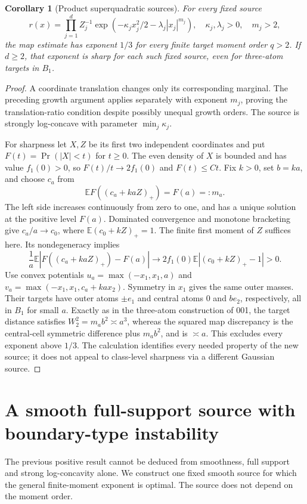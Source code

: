 \documentclass[11pt]{article}
\newtheorem{corollary}[theorem]{Corollary}
\theoremstyle{remark}\newtheorem{remark}[theorem]{Remark}
\newcommand{\E}{\mathbb E}
\begin{document}
\begin{corollary}[Product superquadratic sources]\label{cor:product}
For every fixed source
\[
 r(x)=\prod_{j=1}^d Z_j^{-1}
       \exp(-\kappa_jx_j^2/2-\lambda_j|x_j|^{m_j}),
 \quad \kappa_j,\lambda_j>0,\quad m_j>2,
\]
the map estimate has exponent $1/3$ for every finite target moment order $q>2$. If $d\ge2$, that exponent is sharp for each such fixed source, even for three-atom targets in $B_1$.
\end{corollary}
\begin{proof}
A coordinate translation changes only its corresponding marginal. The preceding growth argument applies separately with exponent $m_j$, proving the translation-ratio condition despite possibly unequal growth orders. The source is strongly log-concave with parameter $\min_j\kappa_j$.

For sharpness let $X,Z$ be its first two independent coordinates and put $F(t)=\Pr(|X|<t)$ for $t\ge0$. The even density of $X$ is bounded and has value $f_1(0)>0$, so $F(t)/t\to2f_1(0)$ and $F(t)\le C t$. Fix $k>0$, set $b=ka$, and choose $c_a$ from
\[
 \E F((c_a+kaZ)_+)=F(a)=:m_a.
\]
The left side increases continuously from zero to one, and has a unique solution at the positive level $F(a)$. Dominated convergence and monotone bracketing give $c_a/a\to c_0$, where $\E(c_0+kZ)_+=1$. The finite first moment of $Z$ suffices here. Its nondegeneracy implies
\[
 \frac1a\E|F((c_a+kaZ)_+)-F(a)|
 \longrightarrow2f_1(0)\E|(c_0+kZ)_+-1|>0.
\]
Use convex potentials $u_a=\max(-x_1,x_1,a)$ and
$v_a=\max(-x_1,x_1,c_a+ka x_2)$. Symmetry in $x_1$ gives the same outer masses. Their targets have outer atoms $\pm e_1$ and central atoms $0$ and $be_2$, respectively, all in $B_1$ for small $a$. Exactly as in the three-atom construction of 001, the target distance satisfies $W_2^2=m_ab^2\asymp a^3$, whereas the squared map discrepancy is the central-cell symmetric difference plus $m_ab^2$, and is $\asymp a$. This excludes every exponent above $1/3$. The calculation identifies every needed property of the new source; it does not appeal to class-level sharpness via a different Gaussian source.
\end{proof}

\section{A smooth full-support source with boundary-type instability}\label{sec:steep}
The previous positive result cannot be deduced from smoothness, full support and strong log-concavity alone. We construct one fixed smooth source for which the general finite-moment exponent is optimal. The source does not depend on the moment order.
\end{document}
